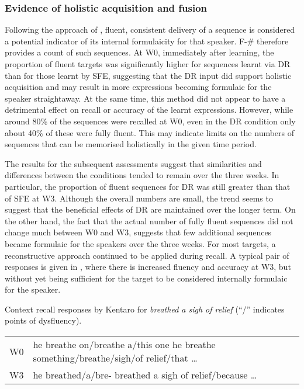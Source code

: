 \documentclass[output=paper]{langscibook}
\begin{document}
\subsubsection{Evidence of holistic acquisition and fusion}
Following the approach of \citet{MylesCordier2017}, fluent, consistent delivery of a sequence is considered a potential indicator of its internal formulaicity for that speaker. F-\# therefore provides a count of such sequences. At W0, immediately after learning, the proportion of fluent targets was significantly higher for sequences learnt via DR than for those learnt by SFE, suggesting that the DR input did support holistic acquisition and may result in more expressions becoming formulaic for the speaker straightaway. At the same time, this method did not appear to have a detrimental effect on recall or accuracy of the learnt expressions. However, while around 80\% of the sequences were recalled at W0, even in the DR condition only about 40\% of these were fully fluent. This may indicate limits on the numbers of sequences that can be memorised holistically in the given time period.

The results for the subsequent assessments suggest that similarities and differences between the conditions tended to remain over the three weeks. In particular, the proportion of fluent sequences for DR was still greater than that of SFE at W3. Although the overall numbers are small, the trend seems to suggest that the beneficial effects of DR are maintained over the longer term. On the other hand, the fact that the actual number of fully fluent sequences did not change much between W0 and W3, suggests that few additional sequences became formulaic for the speakers over the three weeks. For most targets, a reconstructive approach continued to be applied during recall. A typical pair of responses is given in , where there is increased fluency and accuracy at W3, but without yet being sufficient for the target to be considered internally formulaic for the speaker.


\ea Context recall responses by Kentaro for \textit{breathed a sigh of relief} (``/'' indicates points of dysfluency).\label{ex:cutler:1}\smallskip\\
\begin{tabularx}{\linewidth}{@{}lQ@{}}
W0 & he breathe on\slash breathe a\slash this one he breathe something\slash breathe\slash sigh\slash of relief\slash that …\\
W3 & he breathed\slash a\slash bre- breathed a sigh of relief\slash because …\\
\end{tabularx}
\z
\end{document}
